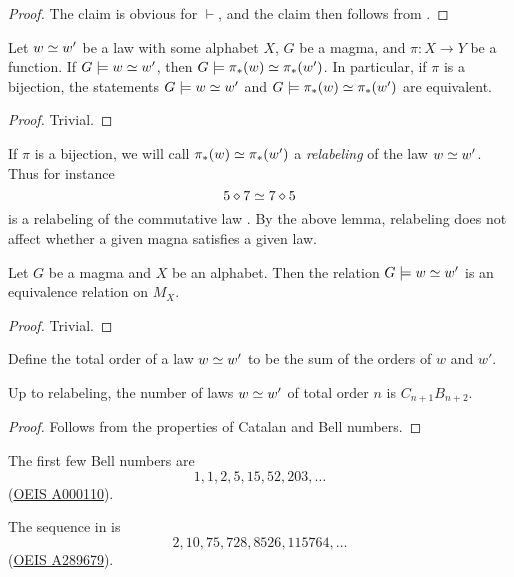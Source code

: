 \begin{proof}
  The claim is obvious for $\vdash$, and the claim then follows from .
\end{proof}

\begin{lemma}[Pushforward]\label{push}
  Let $w \simeq w'$ be a law with some alphabet $X$, $G$ be a magma, and $\pi: X \to Y$ be a function.
  If $G \models w \simeq w'$, then $G \models \pi_*(w) \simeq \pi_*(w')$.
  In particular, if $\pi$ is a bijection, the statements $G \models w \simeq w'$ and $G \models \pi_*(w) \simeq \pi_*(w')$ are equivalent.
\end{lemma}

\begin{proof}
  Trivial.
\end{proof}

If $\pi$ is a bijection, we will call $\pi_*(w) \simeq \pi_*(w')$ a \emph{relabeling} of the law $w \simeq w'$. Thus for instance
$$ 5 \diamond 7 \simeq 7 \diamond 5$$
is a relabeling of the commutative law . By the above lemma, relabeling does not affect whether a given magna satisfies a given law.

\begin{lemma}[Equivalence]\label{equiv}
  Let $G$ be a magma and $X$ be an alphabet.
  Then the relation $G \models w \simeq w'$ is an equivalence relation on $M_X$.
\end{lemma}

\begin{proof}
  Trivial.
\end{proof}

Define the total order of a law $w \simeq w'$ to be the sum of the orders of $w$ and $w'$.

\begin{lemma}\label{law-count}
  Up to relabeling, the number of laws $w \simeq w'$ of total order $n$ is $C_{n+1} B_{n+2}$.
\end{lemma}

\begin{proof}
  Follows from the properties of Catalan and Bell numbers.
\end{proof}

The first few Bell numbers are
$$ 1, 1, 2, 5, 15, 52, 203, \dots$$
(\href{https://oeis.org/A000110}{OEIS A000110}).

The sequence in  is
$$ 2, 10, 75, 728, 8526, 115764, \dots$$
(\href{https://oeis.org/A289679}{OEIS A289679}).

